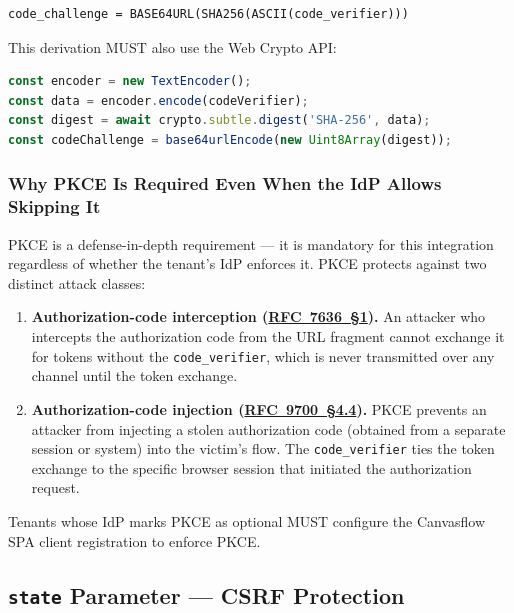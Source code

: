 \begin{lstlisting}
code_challenge = BASE64URL(SHA256(ASCII(code_verifier)))
\end{lstlisting}

This derivation MUST also use the Web Crypto API:

\begin{lstlisting}[language=js]
const encoder = new TextEncoder();
const data = encoder.encode(codeVerifier);
const digest = await crypto.subtle.digest('SHA-256', data);
const codeChallenge = base64urlEncode(new Uint8Array(digest));
\end{lstlisting}

\subsubsection{Why PKCE Is Required Even When the IdP Allows Skipping It}

PKCE is a defense-in-depth requirement --- it is mandatory for this integration regardless
of whether the tenant's IdP enforces it. PKCE protects against two distinct attack
classes:

\begin{enumerate}
  \item \textbf{Authorization-code interception (\href{https://tools.ietf.org/html/rfc7636\#section-1}{RFC~7636~\S1}).} An attacker who
    intercepts the authorization code from the URL fragment cannot exchange it for tokens
    without the \texttt{code\_verifier}, which is never transmitted over any channel
    until the token exchange.

  \item \textbf{Authorization-code injection (\href{https://tools.ietf.org/html/rfc9700\#section-4.4}{RFC~9700~\S4.4}).} PKCE prevents an
    attacker from injecting a stolen authorization code (obtained from a separate session
    or system) into the victim's flow. The \texttt{code\_verifier} ties the token
    exchange to the specific browser session that initiated the authorization request.
\end{enumerate}

Tenants whose IdP marks PKCE as optional MUST configure the Canvasflow SPA client
registration to enforce PKCE.

\subsection{\texttt{state} Parameter --- CSRF Protection}

